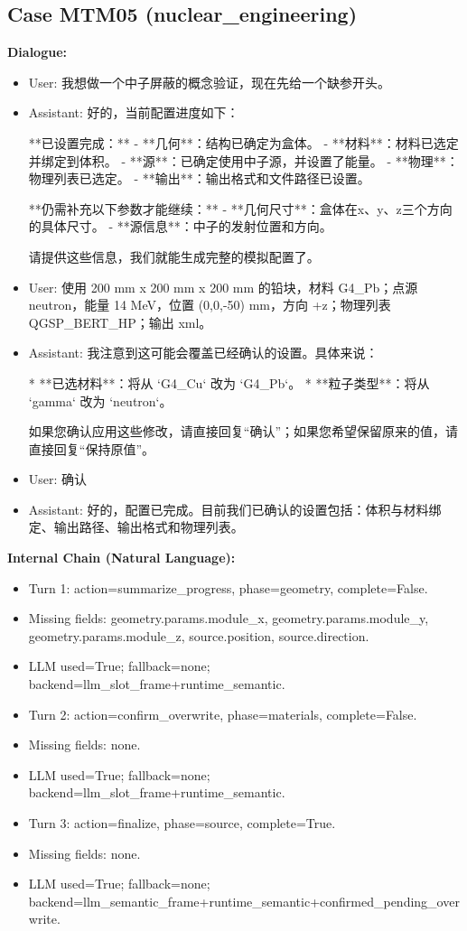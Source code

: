 \documentclass[11pt]{ctexart}
\begin{document}
\subsection{Case MTM05 (nuclear\_engineering)}
\textbf{Dialogue:}
\begin{itemize}
\item User: 我想做一个中子屏蔽的概念验证，现在先给一个缺参开头。
\item Assistant: 好的，当前配置进度如下：

**已设置完成：**
- **几何**：结构已确定为盒体。
- **材料**：材料已选定并绑定到体积。
- **源**：已确定使用中子源，并设置了能量。
- **物理**：物理列表已选定。
- **输出**：输出格式和文件路径已设置。

**仍需补充以下参数才能继续：**
- **几何尺寸**：盒体在x、y、z三个方向的具体尺寸。
- **源信息**：中子的发射位置和方向。

请提供这些信息，我们就能生成完整的模拟配置了。
\item User: 使用 200 mm x 200 mm x 200 mm 的铅块，材料 G4\_Pb；点源 neutron，能量 14 MeV，位置 (0,0,-50) mm，方向 +z；物理列表 QGSP\_BERT\_HP；输出 xml。
\item Assistant: 我注意到这可能会覆盖已经确认的设置。具体来说：

*   **已选材料**：将从 `G4\_Cu` 改为 `G4\_Pb`。
*   **粒子类型**：将从 `gamma` 改为 `neutron`。

如果您确认应用这些修改，请直接回复“确认”；如果您希望保留原来的值，请直接回复“保持原值”。
\item User: 确认
\item Assistant: 好的，配置已完成。目前我们已确认的设置包括：体积与材料绑定、输出路径、输出格式和物理列表。
\end{itemize}
\textbf{Internal Chain (Natural Language):}
\begin{itemize}
\item Turn 1: action=summarize\_progress, phase=geometry, complete=False.
\item Missing fields: geometry.params.module\_x, geometry.params.module\_y, geometry.params.module\_z, source.position, source.direction.
\item LLM used=True; fallback=none; backend=llm\_slot\_frame+runtime\_semantic.
\item Turn 2: action=confirm\_overwrite, phase=materials, complete=False.
\item Missing fields: none.
\item LLM used=True; fallback=none; backend=llm\_slot\_frame+runtime\_semantic.
\item Turn 3: action=finalize, phase=source, complete=True.
\item Missing fields: none.
\item LLM used=True; fallback=none; backend=llm\_semantic\_frame+runtime\_semantic+confirmed\_pending\_overwrite.
\end{itemize}
\end{document}
